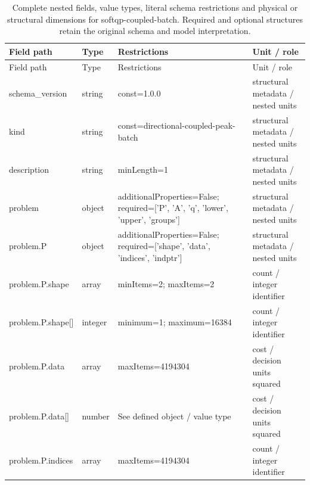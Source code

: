 \begingroup\footnotesize\setlength{\tabcolsep}{3pt}
\begin{longtable}{@{}>{\raggedright\arraybackslash}p{}>{\raggedright\arraybackslash}p{}>{\raggedright\arraybackslash}p{}>{\raggedright\arraybackslash}p{}@{}}
\caption{Complete nested fields, value types, literal schema restrictions and physical or structural dimensions for softqp-coupled-batch. Required and optional structures retain the original schema and model interpretation.}\label{tab:nested-softqp-coupled-batch}\\
\toprule Field path & Type & Restrictions & Unit / role\\\midrule\endfirsthead
\toprule Field path & Type & Restrictions & Unit / role\\\midrule\endhead
\bottomrule\endfoot
schema\_\allowbreak{}version & string & const=\allowbreak{}1.\allowbreak{}0.\allowbreak{}0 & structural metadata /\allowbreak{} nested units\\
kind & string & const=\allowbreak{}directional-\allowbreak{}coupled-\allowbreak{}peak-\allowbreak{}batch & structural metadata /\allowbreak{} nested units\\
description & string & minLength=\allowbreak{}1 & structural metadata /\allowbreak{} nested units\\
problem & object & additionalProperties=\allowbreak{}False; required=\allowbreak{}['P', 'A', 'q', 'lower', 'upper', 'groups'] & structural metadata /\allowbreak{} nested units\\
problem.\allowbreak{}P & object & additionalProperties=\allowbreak{}False; required=\allowbreak{}['shape', 'data', 'indices', 'indptr'] & structural metadata /\allowbreak{} nested units\\
problem.\allowbreak{}P.\allowbreak{}shape & array & minItems=\allowbreak{}2; maxItems=\allowbreak{}2 & count /\allowbreak{} integer identifier\\
problem.\allowbreak{}P.\allowbreak{}shape[] & integer & minimum=\allowbreak{}1; maximum=\allowbreak{}16384 & count /\allowbreak{} integer identifier\\
problem.\allowbreak{}P.\allowbreak{}data & array & maxItems=\allowbreak{}4194304 & cost /\allowbreak{} decision units squared\\
problem.\allowbreak{}P.\allowbreak{}data[] & number & See defined object /\allowbreak{} value type & cost /\allowbreak{} decision units squared\\
problem.\allowbreak{}P.\allowbreak{}indices & array & maxItems=\allowbreak{}4194304 & count /\allowbreak{} integer identifier\\

\end{longtable}
